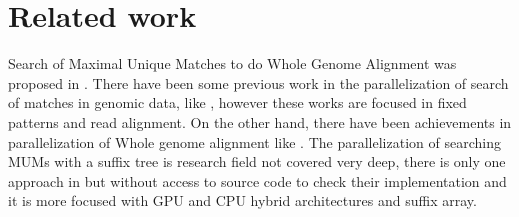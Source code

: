 \documentclass[3p,times]{elsarticle}
\begin{document}
\section{Related work}
Search of Maximal Unique Matches to do Whole Genome Alignment was proposed in \cite{Delcher1999}. There have been some previous work in the parallelization of search of matches in genomic data, like \cite{OguzhanKulekci2011,Mongelli,Kouzinopoulos2005}, however these works are focused in fixed patterns and read alignment. On the other hand, there have been achievements in parallelization of Whole genome alignment like \cite{Meng2005}. The parallelization of searching MUMs with a suffix tree is research field not covered very deep, there is only one approach in \cite{Encarnac2011} but without access to source code to check their implementation and it is more focused with GPU and CPU hybrid architectures and suffix array.
\end{document}
